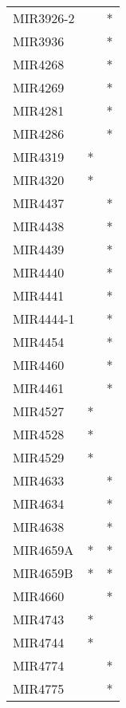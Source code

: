 \begin{longtable}{lcc}
MIR3926-2       &                &          * \\
MIR3936         &                &          * \\
MIR4268         &                &          * \\
MIR4269         &                &          * \\
MIR4281         &                &          * \\
MIR4286         &                &          * \\
MIR4319         &              * &            \\
MIR4320         &              * &            \\
MIR4437         &                &          * \\
MIR4438         &                &          * \\
MIR4439         &                &          * \\
MIR4440         &                &          * \\
MIR4441         &                &          * \\
MIR4444-1       &                &          * \\
MIR4454         &                &          * \\
MIR4460         &                &          * \\
MIR4461         &                &          * \\
MIR4527         &              * &            \\
MIR4528         &              * &            \\
MIR4529         &              * &            \\
MIR4633         &                &          * \\
MIR4634         &                &          * \\
MIR4638         &                &          * \\
MIR4659A        &              * &          * \\
MIR4659B        &              * &          * \\
MIR4660         &                &          * \\
MIR4743         &              * &            \\
MIR4744         &              * &            \\
MIR4774         &                &          * \\
MIR4775         &                &          * \\

\end{longtable}

